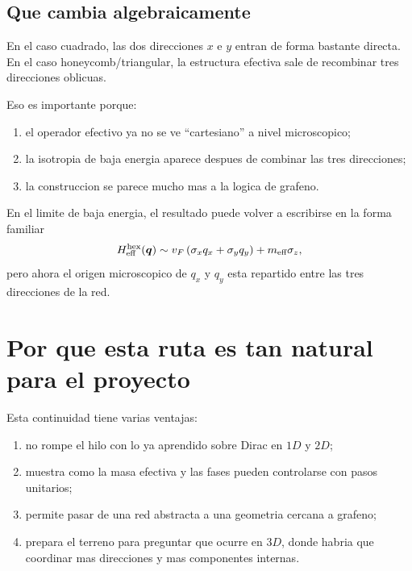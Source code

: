 \subsection{Que cambia algebraicamente}

En el caso cuadrado, las dos direcciones \(x\) e \(y\) entran de forma bastante directa. En el caso honeycomb/triangular, la estructura efectiva sale de recombinar tres direcciones oblicuas.

Eso es importante porque:

\begin{enumerate}[leftmargin=*]
  \item el operador efectivo ya no se ve \enquote{cartesiano} a nivel microscopico;
  \item la isotropia de baja energia aparece despues de combinar las tres direcciones;
  \item la construccion se parece mucho mas a la logica de grafeno.
\end{enumerate}

En el limite de baja energia, el resultado puede volver a escribirse en la forma familiar
\begin{equation}
H_{\text{eff}}^{\mathrm{hex}}(\bm{q})\sim v_F\left(\sigma_x q_x+\sigma_y q_y\right)+m_{\text{eff}}\sigma_z,
\label{c04:eq:heff-honey}
\end{equation}
pero ahora el origen microscopico de \(q_x\) y \(q_y\) esta repartido entre las tres direcciones de la red.

\section{Por que esta ruta es tan natural para el proyecto}

Esta continuidad tiene varias ventajas:

\begin{enumerate}[leftmargin=*]
  \item no rompe el hilo con lo ya aprendido sobre Dirac en \(1D\) y \(2D\);
  \item muestra como la masa efectiva y las fases pueden controlarse con pasos unitarios;
  \item permite pasar de una red abstracta a una geometria cercana a grafeno;
  \item prepara el terreno para preguntar que ocurre en \(3D\), donde habria que coordinar mas direcciones y mas componentes internas.
\end{enumerate}

